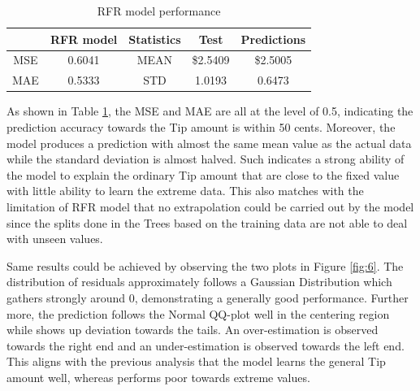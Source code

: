 \documentclass[11pt]{article}
\begin{document}
\begin{table}[h!]
\centering
    \begin{tabular}{||c  c || c  c  c|||}
    \hline
    & RFR model & Statistics & Test & Predictions\\
    \hline\hline
    MSE & 0.6041 & MEAN & \$2.5409 & \$2.5005\\
    MAE & 0.5333 & STD & 1.0193 & 0.6473\\
    \hline
    \end{tabular}
\caption{RFR model performance}
\label{table:4}
\end{table}

As shown in Table \ref{table:4}, the MSE and MAE are all at the level of 0.5, indicating the prediction accuracy towards the Tip amount is within 50 cents. Moreover, the model produces a prediction with almost the same mean value as the actual data while the standard deviation is almost halved. Such indicates a strong ability of the model to explain the ordinary Tip amount that are close to the fixed value with little ability to learn the extreme data. This also matches with the limitation of RFR model that no extrapolation could be carried out by the model since the splits done in the Trees based on the training data are not able to deal with unseen values.

Same results could be achieved by observing the two plots in Figure \ref{fig:6}. The distribution of residuals approximately follows a Gaussian Distribution which gathers strongly around 0, demonstrating a generally good performance. Further more, the prediction follows the Normal QQ-plot well in the centering region while shows up deviation towards the tails. An over-estimation is observed towards the right end and an under-estimation is observed towards the left end. This aligns with the previous analysis that the model learns the general Tip amount well, whereas performs poor towards extreme values.
\end{document}
